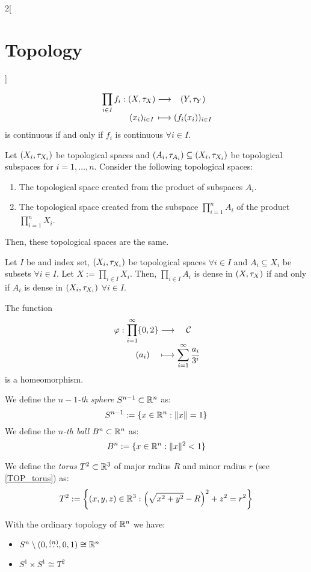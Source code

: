 \documentclass[../../../main.tex]{subfiles}
\begin{document}
\begin{multicols}{2}[\section{Topology}]
\begin{prop}
    $$
      \function{\displaystyle\prod_{i\in I}f_i}{\left(X,\topo_X\right)}{\left(Y,\topo_Y\right)}{(x_i)_{i\in I}}{(f_i(x_i))_{i\in I}}
    $$ is continuous if and only if $f_i$ is continuous $\forall i\in I$.
  \end{prop}
  \begin{prop}
    Let $(X_i,\tau_{X_i})$ be topological spaces and $(A_i,\tau_{A_i})\subseteq (X_i,\tau_{X_i})$ be topological subspaces for $i=1,\ldots, n$. Consider the following topological spaces:
    \begin{enumerate}
      \item The topological space created from the product of subspaces $A_i$.
      \item The topological space created from the subspace $\prod_{i=1}^nA_i$ of the product $\prod_{i=1}^nX_i$.
    \end{enumerate}
    Then, these topological spaces are the same.
  \end{prop}
  \begin{prop}
    Let $I$ be and index set, $(X_i,\tau_{X_i})$ be topological spaces $\forall i\in I$ and $A_i\subseteq X_i$ be subsets $\forall i\in I$. Let $X:=\prod_{i\in I}X_i$. Then, $\prod_{i\in I}A_i$ is dense in $(X,\tau_X)$ if and only if $A_i$ is dense in $(X_i,\tau_{X_i})$ $\forall i\in I$.
  \end{prop}
  \begin{theorem}
    The function
    $$
      \function{\varphi}{\displaystyle\prod_{i=1}^\infty\{0,2\}}{\mathcal{C}}{(a_i)}{\displaystyle\sum_{i=1}^\infty\frac{a_i}{3^i}}
    $$
    is a homeomorphism.
  \end{theorem}
  \begin{definition}
    We define the \emph{$n-1$-th sphere} $S^{n-1}\subset \mathbb{R}^n$ as: $$S^{n-1}:=\{x\in\mathbb{R}^n:\|x\|=1\}$$
    We define the \emph{$n$-th ball} $B^n\subset \mathbb{R}^n$ as: $$B^n:=\{x\in\mathbb{R}^n:\|x\|^2<1\}$$
  \end{definition}
  \begin{definition}[Torus]
    We define the \emph{torus} $T^2\subset \mathbb{R}^3$ of major radius $R$ and minor radius $r$ (see \cref{TOP_torus}) as: $$T^2:=\left\{(x,y,z)\in\mathbb{R}^3:{\left(\sqrt{x^2+y^2}-R\right)}^2+z^2=r^2\right\}$$
  \end{definition}
  \begin{center}
    \begin{minipage}{\linewidth}
      \centering
      
      \label{TOP_torus}
    \end{minipage}
  \end{center}
  \begin{prop}
    With the ordinary topology of $\mathbb{R}^n$ we have:
    \begin{itemize}
      \item $S^n\setminus(0,\overset{(n)}{\ldots},0,1)\cong\mathbb{R}^n$
      \item $S^1\times S^1\cong T^2$
    \end{itemize}
  \end{prop}

\end{multicols}
\end{document}
